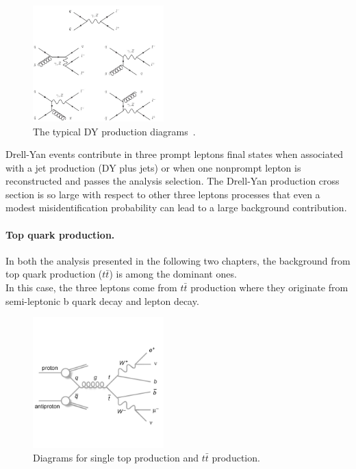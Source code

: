 \begin{figure}[h!]
\centering
  \includegraphics[clip,trim=2cm 4.9cm 2cm 0cm, width=0.45\textwidth]{Figures/c4/dia/The-Feynman-graphs-for-Drell-Yan-pair-production-at-the-Oa-and-Oaa-s-orders_W640.jpeg}
 \caption{The typical DY production
    diagrams~\cite{diagram}.}
  \label{fig:c44}
\end{figure}
Drell-Yan events contribute in three prompt leptons final states when
associated with a jet production (DY plus jets) or when one nonprompt
lepton is reconstructed and passes the analysis selection. The Drell-Yan
production cross section is so large with respect to other three
leptons processes that even a modest misidentification probability can
lead to a large background contribution.

\paragraph{Top quark production.}\label{sec:c4ttbar}
In both the analysis presented in the following two chapters, the
background from top quark production ($t\bar{t}$) is among the
dominant ones. \\
In this case, the three leptons come from $t\bar{t}$ production 
where they originate from semi-leptonic b quark decay and lepton \PW decay.

\begin{figure}[h!]
\centering
 \includegraphics[clip,trim=0cm 3cm 0cm 3cm, width=0.45\textwidth]{Figures/c4/dia/tt.pdf}
  \caption{Diagrams for single top production and $t\bar{t}$ production.~\cite{diagram}}
  \label{fig:c46}
\end{figure}


